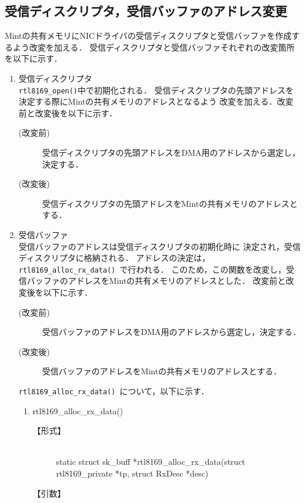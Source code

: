 \documentclass[12pt]{jsarticle}
\begin{document}
\subsection{受信ディスクリプタ，受信バッファのアドレス変更}
Mintの共有メモリにNICドライバの受信ディスクリプタと受信バッファを作成するよう改変を加える．
受信ディスクリプタと受信バッファそれぞれの改変箇所を以下に示す．
\begin{enumerate}
    \item 受信ディスクリプタ\\
        {\tt rtl8169\_open()}中で初期化される．
        受信ディスクリプタの先頭アドレスを決定する際にMintの共有メモリのアドレスとなるよう
        改変を加える．改変前と改変後を以下に示す．
        \begin{description}
            \item[(改変前)]受信ディスクリプタの先頭アドレスをDMA用のアドレスから選定し，決定する．
            \item[(改変後)]受信ディスクリプタの先頭アドレスをMintの共有メモリのアドレスとする．
        \end{description}
    \item 受信バッファ\\
        受信バッファのアドレスは受信ディスクリプタの初期化時に
        決定され，受信ディスクリプタに格納される．
        アドレスの決定は，{\tt rtl8169\_alloc\_rx\_data() }で行われる．
        このため，この関数を改変し，受信バッファのアドレスをMintの共有メモリのアドレスとした．
        改変前と改変後を以下に示す．
        \begin{description}
            \item[(改変前)]受信バッファのアドレスをDMA用のアドレスから選定し，決定する．
            \item[(改変後)]受信バッファのアドレスをMintの共有メモリのアドレスとする．
        \end{description}
        {\tt rtl8169\_alloc\_rx\_data() }について，以下に示す．
        \begin{enumerate}
            \item rtl8169\_alloc\_rx\_data()
                \begin{description}
                    \item[【形式】]\mbox{}\\
                        static struct sk\_buff *rtl8169\_alloc\_rx\_data(struct rtl8169\_private *tp, struct RxDesc *desc)
                    \item[【引数】]\mbox{}\\

\end{description}
\end{enumerate}
\end{enumerate}
\end{document}
